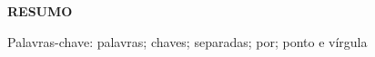 \thispagestyle{empty}
\begin{center}
\textbf{\MakeUppercase{Resumo}}
\end{center}

\begin{spacing}{1}
\lipsum[5]
\end{spacing}

\vspace{1em}

Palavras-chave: palavras; chaves; separadas; por; ponto e vírgula
\newpage